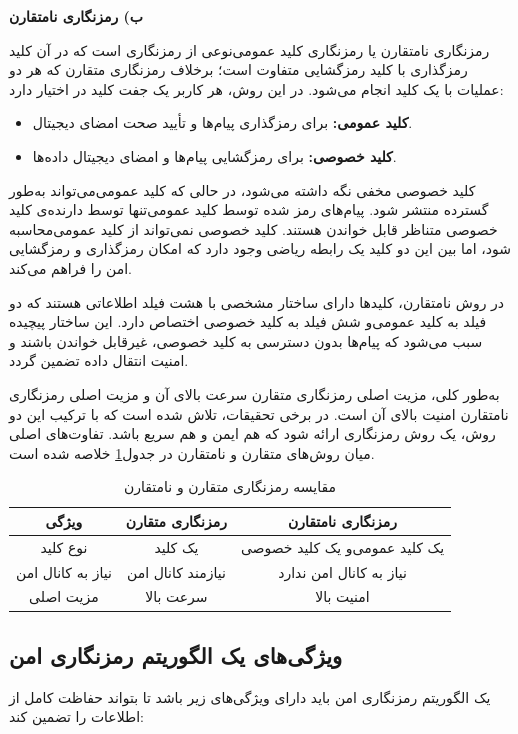 \documentclass[a4paper,12pt]{report}
\renewcommand{\%}{\lr{\oldpercent}}
\begin{document}
\textbf{ب) رمزنگاری نامتقارن}

رمزنگاری نامتقارن یا رمزنگاری کلید عمومی‌نوعی از رمزنگاری است که در آن کلید رمزگذاری با کلید رمزگشایی متفاوت است؛ برخلاف رمزنگاری متقارن که هر دو عملیات با یک کلید انجام می‌شود. در این روش، هر کاربر یک جفت کلید در اختیار دارد:
\begin{itemize}
    \item \textbf{کلید عمومی:} برای رمزگذاری پیام‌ها و تأیید صحت امضای دیجیتال.
    \item \textbf{کلید خصوصی:} برای رمزگشایی پیام‌ها و امضای دیجیتال داده‌ها.
\end{itemize}

کلید خصوصی مخفی نگه داشته می‌شود، در حالی که کلید عمومی‌می‌تواند به‌طور گسترده منتشر شود. پیام‌های رمز شده توسط کلید عمومی‌تنها توسط دارنده‌ی کلید خصوصی متناظر قابل خواندن هستند. کلید خصوصی نمی‌تواند از کلید عمومی‌محاسبه شود، اما بین این دو کلید یک رابطه ریاضی وجود دارد که امکان رمزگذاری و رمزگشایی امن را فراهم می‌کند.

در روش نامتقارن، کلیدها دارای ساختار مشخصی با هشت فیلد اطلاعاتی هستند که دو فیلد به کلید عمومی‌و شش فیلد به کلید خصوصی اختصاص دارد\cite{ref28}. این ساختار پیچیده سبب می‌شود که پیام‌ها بدون دسترسی به کلید خصوصی، غیرقابل خواندن باشند و امنیت انتقال داده تضمین گردد.

به‌طور کلی، مزیت اصلی رمزنگاری متقارن سرعت بالای آن و مزیت اصلی رمزنگاری نامتقارن امنیت بالای آن است. در برخی تحقیقات، تلاش شده است که با ترکیب این دو روش، یک روش رمزنگاری ارائه شود که هم ایمن و هم سریع باشد\cite{ref29}. تفاوت‌های اصلی میان روش‌های متقارن و نامتقارن در جدول\ref{tab:comparison} خلاصه شده است.

\begin{table}[h]
\centering
\caption{مقایسه رمزنگاری متقارن و نامتقارن} \label{tab:comparison}
\begin{tabular}{|c|c|c|}
\hline
\textbf{ویژگی} & \textbf{رمزنگاری متقارن} & \textbf{رمزنگاری نامتقارن} \\ \hline
نوع کلید & یک کلید & یک کلید عمومی‌و یک کلید خصوصی \\ \hline
نیاز به کانال امن & نیازمند کانال امن & نیاز به کانال امن ندارد \\ \hline
مزیت اصلی & سرعت بالا & امنیت بالا \\ \hline
\end{tabular}
\end{table}

\subsection{ویژگی‌های یک الگوریتم رمزنگاری امن}
یک الگوریتم رمزنگاری امن باید دارای ویژگی‌های زیر باشد تا بتواند حفاظت کامل از اطلاعات را تضمین کند\cite{ref31}:
\end{document}
